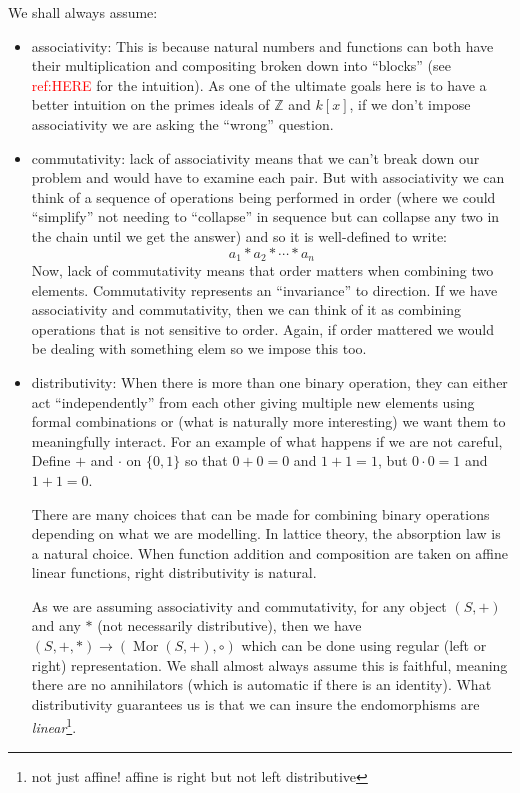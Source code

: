\documentclass{article}
\newcommand{\Z}{{\mathbb{Z}}}
\newcommand{\Mor}{{\operatorname{Mor}}}
\begin{document}
We shall always assume:
\begin{itemize}
  \item associativity: This is because natural numbers and functions can both have their multiplication and
    compositing broken down into ``blocks'' (see \textcolor{red}{ref:HERE} for the intuition). As one of the
    ultimate goals here is to have a better intuition on the primes ideals of $\Z$ and $k[x]$, if we don't
    impose associativity we are asking the ``wrong'' question.
    \item commutativity: lack of associativity means that we can't break down our problem and would have to
      examine each pair. But with associativity we can think of a sequence of operations being performed in
      order (where we could ``simplify'' not needing to ``collapse'' in sequence but can collapse any two in
      the chain until we get the answer) and so it is well-defined
      to write:
      \[
        a_1 * a_2 * \cdots * a_n
      \]
      Now, lack of commutativity means that order matters when combining two elements. Commutativity
      represents an ``invariance'' to direction. If we have associativity and commutativity, then we can think of it as
      combining operations that is not sensitive to order. Again, if order mattered we would be dealing with
      something elem so we impose this too.
      \item distributivity: When there is more than one binary operation, they can either act
        ``independently'' from each other giving multiple new elements using formal combinations or (what is
        naturally more interesting) we want them to meaningfully interact. For an example of what happens if
        we are not careful, Define $+$ and $\cdot$ on $\{0,1\}$ so that $0+0 = 0$ and $1+1 = 1$, but $0\cdot
        0 = 1$ and $1+1=0$.

        There are many choices that can be made for combining binary operations depending on what we are
        modelling. In lattice theory, the absorption law is a natural choice. When function addition and
        composition are taken on affine linear functions, right distributivity is natural.

        As we are assuming associativity and commutativity, for any object $(S,+)$ and any $*$ (not
        necessarily distributive), then we have $(S, +, *) \to (\Mor(S, +), \circ)$ which can be done using
        regular (left or right) representation. We shall almost always
        assume this is faithful, meaning there are no annihilators (which is automatic if there is an
        identity). What distributivity guarantees us is that we can insure the endomorphisms are
        \emph{linear}\footnote{not just affine! affine is right but not left distributive}.


\end{itemize}
\end{document}
